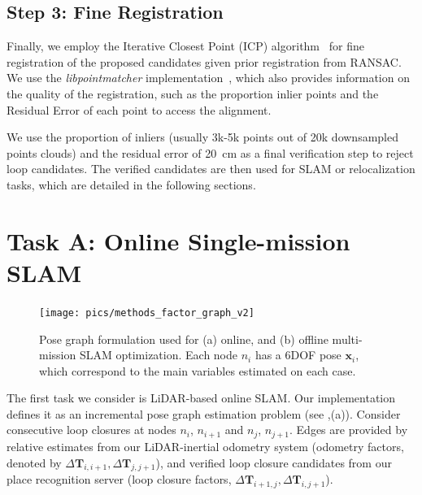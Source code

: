 \subsection*{\textbf{Step 3: Fine Registration}}
\label{subsubsec:fine-registration}
Finally, we employ the Iterative Closest Point (ICP) algorithm~\cite{besl1992icp} for fine registration of the proposed candidates given prior registration from RANSAC. We use the \emph{libpointmatcher} implementation~\cite{pomerleau2013iros}, which also provides information on the quality of the registration, such as the proportion inlier points and the Residual Error of each point to access the alignment.

We use the proportion of inliers (usually 3k-5k points out of 20k downsampled points clouds) and the residual error of \SI{20}{\centi\meter} as a final verification step to reject loop candidates. The verified candidates are then used for SLAM or relocalization tasks, which are detailed in the following sections.

\section{Task A: Online Single-mission SLAM} 
\label{sec:online_slam_mode}
\begin{figure}[t]
  \centering
  \texttt{[image: pics/methods\_factor\_graph\_v2]}
  \caption{Pose graph formulation used for (a) online, and (b) offline multi-mission SLAM optimization. Each node $n_{i}$ has a 6DOF pose $\mathbf{x}_{i}$, which correspond to the main variables estimated on each case.}
  \label{fig:factor_graph}
\end{figure}

The first task we consider is LiDAR-based online SLAM. Our implementation defines it as an incremental pose graph estimation problem (see ,(a)). Consider consecutive loop closures at nodes $n_{i}$, $n_{i+1}$ and $n_{j}$, $n_{j+1}$. Edges are provided by relative estimates from our LiDAR-inertial odometry system (odometry factors, denoted by $\Delta\mathbf{T}_{i,i+1}, \Delta\mathbf{T}_{j, j+1}$), and verified loop closure candidates from our place recognition server (loop closure factors, $\Delta\mathbf{T}_{i+1, j}, \Delta\mathbf{T}_{i, j+1}$).

